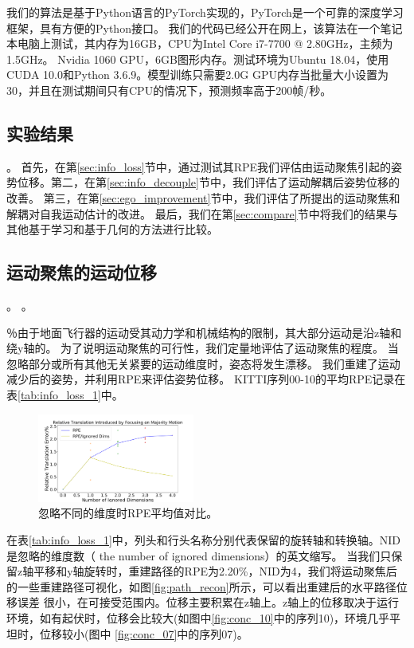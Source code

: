 {我们的算法是基于Python语言的PyTorch实现的，PyTorch是一个可靠的深度学习框架，具有方便的Python接口}。
我们的代码已经公开在网上，该算法在一个笔记本电脑上测试，其内存为16GB，CPU为Intel Core i7-7700 @ 2.80GHz，主频为1.5GHz。
Nvidia 1060 GPU，6GB图形内存。测试环境为Ubuntu 18.04，使用CUDA 10.0和Python 3.6.9。模型训练只需要2.0G GPU内存{当批量大小设置为30}，并且在测试期间只有CPU的情况下，预测频率高于200{帧/秒}。


\subsection{实验结果}。
首先，在第\ref{sec:info_loss}节中，通过测试其RPE我们评估由运动聚焦引起的姿势位移。第二，在第\ref{sec:info_decouple}节中，我们评估了运动解耦后姿势位移的改善。
第三，在第\ref{sec:ego_improvement}节中，我们评估了所提出的运动聚焦和解耦对自我运动估计的改进。
最后，我们在第\ref{sec:compare}节中将我们的结果与其他基于学习和基于几何的方法进行比较。

\subsection{运动聚焦的运动位移}。
\label{sec:info_loss}。

％由于地面飞行器的运动受其动力学和机械结构的限制，其大部分运动是沿z轴和绕y轴的。
为了说明运动聚焦的可行性，我们定量地评估了运动聚焦的程度。
当忽略部分或所有其他无关紧要的运动维度时，姿态将发生漂移。 
我们重建了运动减少后的姿势，并利用RPE\cite{geiger2012kitti}来评估姿势位移。 {KITTI序列00-10的平均RPE记录在表\ref{tab:info_loss_1}}中。 

\begin{figure}[ht]
    \centering
    \includegraphics[width=0.46\textwidth]{datavo/info_loss.pdf}
    \caption{忽略不同的维度时RPE平均值对比。}
    \label{fig:info_loss}
\end{figure}

在表\ref{tab:info_loss_1}中，列头和行头名称分别代表保留的旋转轴和转换轴。NID是忽略的维度数（ the number of ignored dimensions）的英文缩写。
当我们只保留z轴平移和y轴旋转时，重建路径的RPE为2.20\%，NID为4，我们将运动聚焦后的一些重建路径可视化，如图\ref{fig:path_recon}所示，可以看出重建后的水平路径位移误差
很小，在可接受范围内。位移主要积累在z轴上。z轴上的位移取决于运行环境，如有起伏时，位移会比较大(如图中\ref{fig:conc_10}中的序列10)，环境几乎平坦时，位移较小(图中
\ref{fig:conc_07}中的序列07)。

